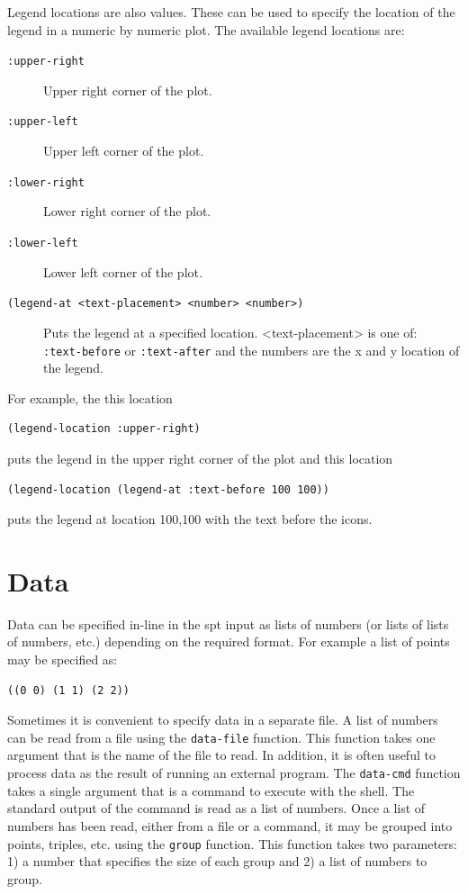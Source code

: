 \documentclass{article}
\begin{document}
Legend locations are also values.  These can be used to specify the
location of the legend in a numeric by numeric plot.  The available
legend locations are:
\begin{description}
\item[{\tt :upper-right}] Upper right corner of the plot.
\item[{\tt :upper-left}] Upper left corner of the plot.
\item[{\tt :lower-right}] Lower right corner of the plot.
\item[{\tt :lower-left}] Lower left corner of the plot.
\item[{\tt (legend-at <text-placement> <number> <number>)}] Puts the
  legend at a specified location.  <text-placement> is one of: {\tt
    :text-before} or {\tt :text-after} and the numbers are the x and y
  location of the legend.
\end{description}
For example, the this location
\begin{verbatim}
(legend-location :upper-right)
\end{verbatim}
puts the legend in the upper right corner of the plot and this
location
\begin{verbatim}
(legend-location (legend-at :text-before 100 100))
\end{verbatim}
puts the legend at location 100,100 with the text before the icons.

\section{Data}

Data can be specified in-line in the spt input as lists of numbers (or
lists of lists of numbers, etc.) depending on the required format.
For example a list of points may be specified as:
\begin{verbatim}
((0 0) (1 1) (2 2))
\end{verbatim}

Sometimes it is convenient to specify data in a separate file.  A list
of numbers can be read from a file using the {\tt data-file} function.
This function takes one argument that is the name of the file to read.
In addition, it is often useful to process data as the result of
running an external program. The {\tt data-cmd} function takes a
single argument that is a command to execute with the shell.  The
standard output of the command is read as a list of numbers.
Once a list of numbers has been read, either from a file or a command,
it may be grouped into points, triples, etc. using the {\tt group}
function.  This function takes two parameters: 1) a number that
specifies the size of each group and 2) a list of numbers to group.
\end{document}
